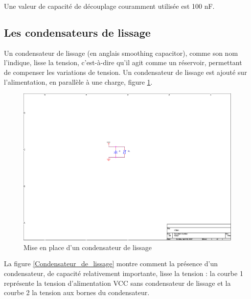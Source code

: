 \documentclass[a4paper]{article}
\begin{document}
Une valeur de capacité de découplage couramment utilisée est 100 nF.

\subsection{Les condensateurs de lissage}

Un condensateur de lissage (en anglais \og{}smoothing capacitor\fg{}), comme son nom l'indique, \og{}lisse\fg{} la tension, c'est-à-dire qu'il agit comme un réservoir, permettant de compenser les variations de tension. Un condensateur de lissage est ajouté sur l'alimentation, en parallèle à une charge, figure \ref{Condensateur_de_lissage_schema}.

\begin{figure}[H]
	\centering
	\includegraphics[scale=1.00]{Images/Condensateur_de_lissage_schema}
	\caption{Mise en place d'un condensateur de lissage
		\label{Condensateur_de_lissage_schema}}
\end{figure}

La figure \ref{Condensateur_de_lissage} montre comment la présence d'un condensateur, de capacité relativement importante, lisse la tension : la courbe 1 représente la tension d'alimentation VCC sans condensateur de lissage et la courbe 2 la tension aux bornes du condensateur.
\end{document}
